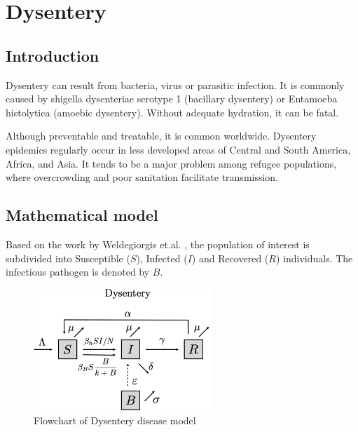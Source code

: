 \documentclass{book}
\begin{document}
\section{Dysentery}

\subsection*{Introduction}
Dysentery can result from bacteria, virus or parasitic infection. It is commonly caused by shigella dysenteriae serotype 1 (bacillary dysentery) or Entamoeba histolytica (amoebic dysentery). Without adequate hydration, it can be fatal.

Although preventable and treatable, it is common worldwide. Dysentery epidemics regularly occur in less developed areas of Central and South America, Africa, and Asia. It tends to be a major problem among refugee populations, where overcrowding and poor sanitation facilitate transmission.

\subsection*{Mathematical model}

Based on the work by Weldegiorgis et.al. \cite{berhe2019parameter}, the population of interest is subdivided into Susceptible ($S$), Infected ($I$) and Recovered ($R$) individuals. The infectious pathogen is denoted by $B$.

\begin{figure}[H]
    \centering
    \includegraphics[width = 0.6\textwidth]{Flowcharts/dysentery.png}
    \caption{Flowchart of Dysentery disease model}
    \label{fig:dysentery_flow}
\end{figure}
\end{document}
